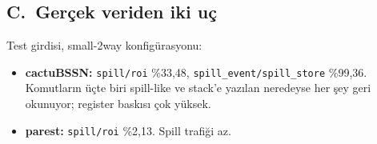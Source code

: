 \documentclass[10pt,a4paper]{article}
\newcommand{\ct}[1]{\texttt{#1}}
\begin{document}
\subsection*{C.\ Ger\c{c}ek veriden iki u\c{c}}

Test girdisi, small-2way konfig\"urasyonu:
\begin{itemize}
\setlength{\itemsep}{1pt}\setlength{\topsep}{2pt}
\item \textbf{cactuBSSN:} \ct{spill/roi} \%33,48,
  \ct{spill\_event/spill\_store} \%99,36. Komutlar{\i}n \"u\c{c}te biri spill-like
  ve stack'e yaz{\i}lan neredeyse her \c{s}ey geri okunuyor; register bask{\i}s{\i} \c{c}ok
  y\"uksek.
\item \textbf{parest:} \ct{spill/roi} \%2,13. Spill trafi\u{g}i az.
\end{itemize}

\endgroup
\end{document}
